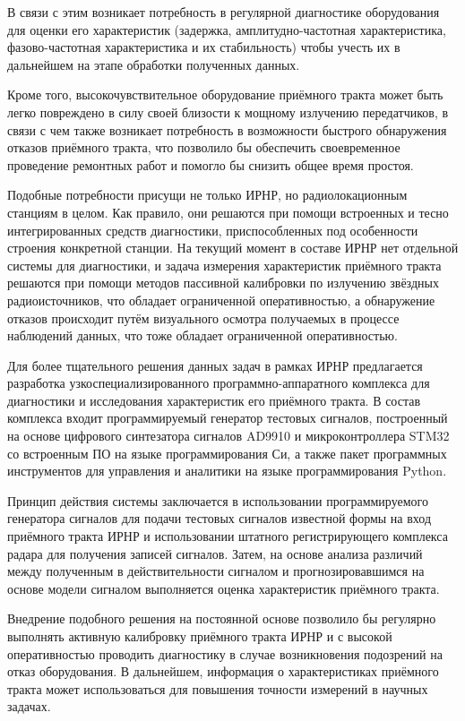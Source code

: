 \documentclass{report}
\begin{document}
В связи с этим возникает потребность в регулярной диагностике оборудования для оценки его характеристик (задержка, амплитудно-частотная характеристика, фазово-частотная характеристика и их стабильность) чтобы учесть их в дальнейшем на этапе обработки полученных данных.

Кроме того, высокочувствительное оборудование приёмного тракта может быть легко повреждено в силу своей близости к мощному излучению передатчиков, в связи с чем также возникает потребность в возможности быстрого обнаружения отказов приёмного тракта, что позволило бы обеспечить своевременное проведение ремонтных работ и помогло бы снизить общее время простоя.

Подобные потребности присущи не только ИРНР, но радиолокационным станциям в целом. Как правило, они решаются при помощи встроенных и тесно интегрированных средств диагностики, приспособленных под особенности строения конкретной станции. На текущий момент в составе ИРНР нет отдельной системы для диагностики, и задача измерения характеристик приёмного тракта решаются при помощи методов пассивной калибровки по излучению звёздных радиоисточников, что обладает ограниченной оперативностью, а обнаружение отказов происходит путём визуального осмотра получаемых в процессе наблюдений данных, что тоже обладает ограниченной оперативностью.

Для более тщательного решения данных задач в рамках ИРНР предлагается разработка узкоспециализированного программно-аппаратного комплекса для диагностики и исследования характеристик его приёмного тракта. В состав комплекса входит программируемый генератор тестовых сигналов, построенный на основе цифрового синтезатора сигналов AD9910 и микроконтроллера STM32 со встроенным ПО на языке программирования Си, а также пакет программных инструментов для управления и аналитики на языке программирования Python.

Принцип действия системы заключается в использовании программируемого генератора сигналов для подачи тестовых сигналов известной формы на вход приёмного тракта ИРНР и использовании штатного регистрирующего комплекса радара для получения записей сигналов. Затем, на основе анализа различий между полученным в действительности сигналом и прогнозировавшимся на основе модели сигналом выполняется оценка характеристик приёмного тракта.

Внедрение подобного решения на постоянной основе позволило бы регулярно выполнять активную калибровку приёмного тракта ИРНР и с высокой оперативностью проводить диагностику в случае возникновения подозрений на отказ оборудования. В дальнейшем, информация о характеристиках приёмного тракта может использоваться для повышения точности измерений в научных задачах.
\end{document}

